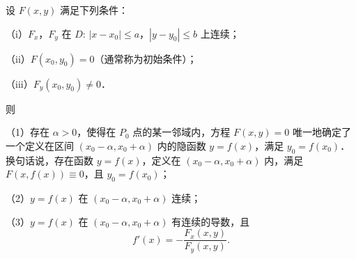 \begin{theorem}\label{thm:17-1}
设 $F(x,y)$ 满足下列条件：

（i）$F_{x}$，$F_{y}$ 在 $D$: $\left|x-x_{0}\right|\leqslant a$，$\left|y-y_{0}\right|\leqslant b$ 上连续；

（ii）$F(x_{0},y_{0})=0$（通常称为初始条件）；

（iii）$F_{y}(x_{0},y_{0})\neq0$．

则

（1）存在 $\alpha>0$，使得在 $P_{0}$ 点的某一邻域内，方程 $F(x,y)=0$ 唯一地确定了一个定义在区间 $(x_{0}-\alpha,x_{0}+\alpha)$ 内的隐函数 $y=f(x)$，满足 $y_{0}=f(x_{0})$．换句话说，存在函数 $y=f(x)$，定义在 $(x_{0}-\alpha,x_{0}+\alpha)$ 内，满足 $F(x,f(x))\equiv0$，且 $y_{0}=f(x_{0})$；

（2）$y=f(x)$ 在 $(x_{0}-\alpha,x_{0}+\alpha)$ 连续；

（3）$y=f(x)$ 在 $(x_{0}-\alpha,x_{0}+\alpha)$ 有连续的导数，且
\[
f'(x)=-\frac{F_{x}(x,y)}{F_{y}(x,y)}.
\]
\end{theorem}

